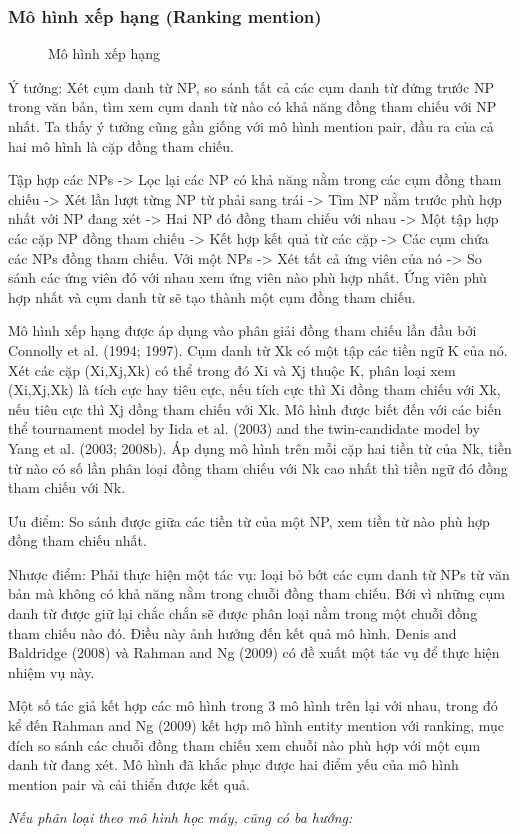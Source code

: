\documentclass[12pt]{extarticle}
\begin{document}
			\subsubsection*{Mô hình xếp hạng (Ranking mention)}
				\begin{figure}[H]
					\centering
					
					\caption{Mô hình xếp hạng}
				\end{figure}
				\par Ý tưởng: Xét cụm danh từ NP, so sánh tất cả các cụm danh từ đứng trước NP trong văn bản, tìm xem cụm danh từ nào có khả năng đồng tham chiếu với NP nhất. Ta thấy ý tưởng cũng gần giống với mô hình mention pair, đầu ra của cả hai mô hình là cặp đồng tham chiếu.
				\par Tập hợp các NPs -> Lọc lại các NP có khả năng nằm trong các cụm đồng tham chiếu -> Xét lần lượt từng NP từ phải sang trái -> Tìm NP nằm trước phù hợp nhất với NP đang xét -> Hai NP đó đồng tham chiếu với nhau -> Một tập hợp các cặp NP đồng tham chiếu -> Kết hợp kết quả từ các cặp -> Các cụm chứa các NPs đồng tham chiếu.
				Với một NPs -> Xét tất cả ứng viên của nó -> So sánh các ứng viên đó với nhau xem ứng viên nào phù hợp nhất. Ứng viên phù hợp nhất và cụm danh từ sẽ tạo thành một cụm đồng tham chiếu.
				\par Mô hình xếp hạng được áp dụng vào phân giải đồng tham chiếu lần đầu bởi Connolly et al. (1994; 1997). Cụm danh từ Xk có một tập các tiền ngữ K của nó. Xét các cặp (Xi,Xj,Xk) có thể trong đó Xi và Xj thuộc K, phân loại xem (Xi,Xj,Xk) là tích cực hay tiêu cực, nếu tích cực thì Xi đồng tham chiếu với Xk, nếu tiêu cực thì Xj dồng tham chiếu với Xk. Mô hình được biết đến với các biến thể tournament
				model by Iida et al. (2003) and the twin-candidate model by Yang et al. (2003; 2008b). Áp dụng mô hình trên mỗi cặp hai tiền từ của Nk, tiền từ nào có số lần phân loại đồng tham chiếu với Nk cao nhất thì tiền ngữ đó đồng tham chiếu với Nk.
				\par Ưu điểm: So sánh được giữa các tiền từ của một NP, xem tiền từ nào phù hợp đồng tham chiếu nhất.
				\par Nhược điểm: Phải thực hiện một tác vụ: loại bỏ bớt các cụm danh từ NPs từ văn bản mà không có khả năng nằm trong chuỗi đồng tham chiếu. Bới vì những cụm danh từ được giữ lại chắc chắn sẽ được phân loại nằm trong một chuỗi đồng tham chiếu nào đó. Điều này ảnh hưởng đến kết quả mô hình. Denis and Baldridge (2008) và Rahman and Ng (2009) có đề xuất một tác vụ để thực hiện nhiệm vụ này.					
				\par Một số tác giả kết hợp các mô hình trong 3 mô hình trên lại với nhau, trong đó kể đến Rahman and Ng (2009) kết hợp mô hình entity mention với ranking, mục đích so sánh các chuỗi đồng tham chiếu xem chuỗi nào phù hợp với một cụm danh từ đang xét. Mô hình đã khắc phục được hai điểm yếu của mô hình mention pair và cải thiển được kết quả.
			\par \textit{Nếu phân loại theo mô hình học máy, cũng có ba hướng:}
\end{document}
